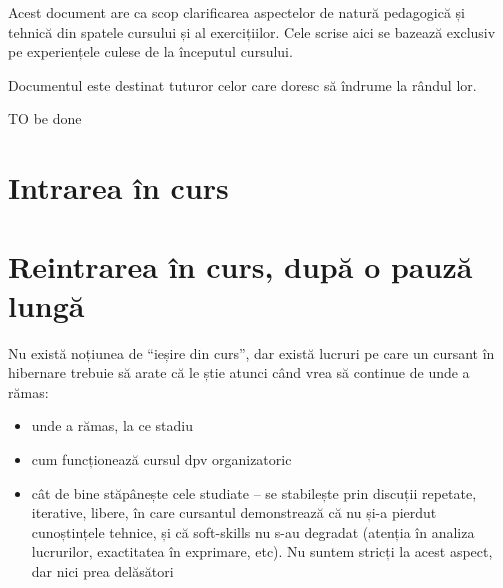 
\begin{chapsummary}
Acest document are ca scop clarificarea aspectelor de natură pedagogică și
tehnică din spatele cursului și al exercițiilor. Cele scrise aici se bazează
exclusiv pe experiențele culese de la începutul cursului.

Documentul este destinat tuturor celor care doresc să îndrume la rândul lor.
\end{chapsummary}

TO be done

\section{Intrarea în curs}

\section{Reintrarea în curs, după o pauză lungă}

Nu există noțiunea de ``ieșire din curs'', dar există lucruri pe care un cursant
în hibernare trebuie să arate că le știe atunci când vrea să continue de unde a
rămas:

\begin{itemize}
\item unde a rămas, la ce stadiu
\item cum funcționează cursul dpv organizatoric
\item cât de bine stăpânește cele studiate -- se stabilește prin discuții repetate,
    iterative, libere, în care cursantul demonstrează că nu și-a pierdut cunoștințele tehnice,
    și că soft-skills nu s-au degradat (atenția în analiza lucrurilor, exactitatea
    în exprimare, etc). Nu suntem stricți la acest aspect, dar nici prea delăsători
\end{itemize}
